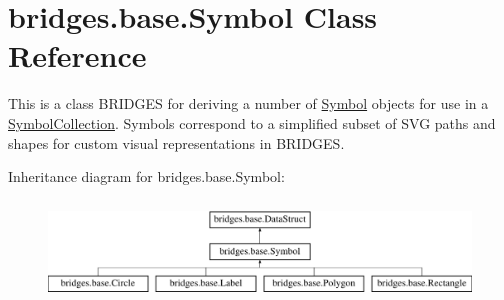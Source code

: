 \hypertarget{classbridges_1_1base_1_1_symbol}{}\section{bridges.\+base.\+Symbol Class Reference}
\label{classbridges_1_1base_1_1_symbol}


This is a class B\+R\+I\+D\+G\+ES for deriving a number of \mbox{\hyperlink{classbridges_1_1base_1_1_symbol}{Symbol}} objects for use in a \mbox{\hyperlink{classbridges_1_1base_1_1_symbol_collection}{Symbol\+Collection}}. Symbols correspond to a simplified subset of S\+VG paths and shapes for custom visual representations in B\+R\+I\+D\+G\+ES.  


Inheritance diagram for bridges.\+base.\+Symbol\+:\begin{figure}[H]
\begin{center}
\leavevmode
\includegraphics[height=2.692308cm]{classbridges_1_1base_1_1_symbol}
\end{center}
\end{figure}
